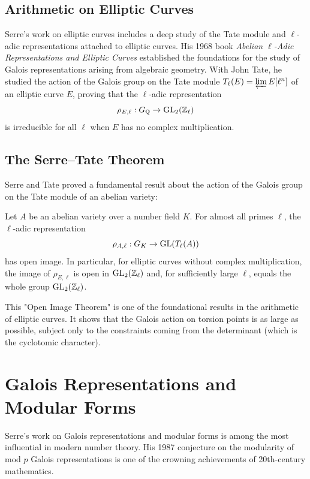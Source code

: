 \subsection{Arithmetic on Elliptic Curves}

Serre's work on elliptic curves includes a deep study of the Tate module and \(\ell\)-adic representations attached to elliptic curves. His 1968 book \textit{Abelian \(\ell\)-Adic Representations and Elliptic Curves} established the foundations for the study of Galois representations arising from algebraic geometry. With John Tate, he studied the action of the Galois group on the Tate module \(T_\ell(E) = \varprojlim E[\ell^n]\) of an elliptic curve \(E\), proving that the \(\ell\)-adic representation
\[
\rho_{E,\ell}: G_{\mathbb{Q}} \to \operatorname{GL}_2(\mathbb{Z}_\ell)
\]
is irreducible for all \(\ell\) when \(E\) has no complex multiplication.

\subsection{The Serre--Tate Theorem}

Serre and Tate proved a fundamental result about the action of the Galois group on the Tate module of an abelian variety:
\begin{theorem}
Let \(A\) be an abelian variety over a number field \(K\). For almost all primes \(\ell\), the \(\ell\)-adic representation
\[
\rho_{A,\ell}: G_K \to \operatorname{GL}(T_\ell(A))
\]
has open image. In particular, for elliptic curves without complex multiplication, the image of \(\rho_{E,\ell}\) is open in \(\operatorname{GL}_2(\mathbb{Z}_\ell)\) and, for sufficiently large \(\ell\), equals the whole group \(\operatorname{GL}_2(\mathbb{Z}_\ell)\).
\end{theorem}

This "Open Image Theorem" is one of the foundational results in the arithmetic of elliptic curves. It shows that the Galois action on torsion points is as large as possible, subject only to the constraints coming from the determinant (which is the cyclotomic character).

\section{Galois Representations and Modular Forms}

Serre's work on Galois representations and modular forms is among the most influential in modern number theory. His 1987 conjecture on the modularity of mod \(p\) Galois representations is one of the crowning achievements of 20th-century mathematics.

